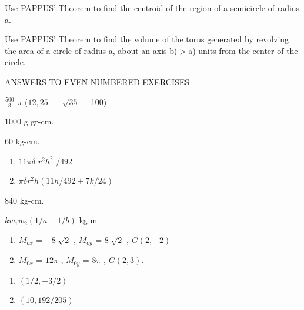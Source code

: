 \documentclass[11pt]{amsbook}
\begin{document}
   	 \begin{hEnumerateArabic}
 		 \setcounter{enumi}{58}
  		 \item Use PAPPUS' Theorem to  find the centroid of the region of a semicircle 
         	 of radius a.
         	 \item Use PAPPUS' Theorem to find the volume of the torus generated by 
        	 revolving the area of a circle of radius a, about an axis b($>$a) units 
         	 from the center of the circle. \\
	\end{hEnumerateArabic}
    
    	 ANSWERS TO EVEN NUMBERED EXERCISES
    	\begin{hEnumerateArabic}
    		\setcounter{enumi}{35}
    		\item \( \frac{500}{3} \) $\pi$ ($12,25$ + $\sqrt[]{35}$ + 100)
    		\setcounter{enumi}{37}
   			\item 1000 g gr-cm.  
    		\setcounter{enumi}{39}
   			\item 60 kg-cm.
    		\setcounter{enumi}{41}
                \item
    			\begin{enumerate}[label=\alph*)]
				\item $11$$\pi$$\delta$ $r^2$$h^2$ $/ 492$   
        			\item $\pi$$\delta$$r^2$$h(11h/492 + 7k/24)$
   			\end{enumerate}	
    		\setcounter{enumi}{43}
   		\item 840 kg-cm.
    		\setcounter{enumi}{45}
    		\item $kw_1w_2(1/a -1/b)$ kg-m
           	\setcounter{enumi}{47}
           	\item
			 \begin{enumerate}[label=\alph*)]
				\item $M_{ox}$ = $-8 \sqrt[]{2}$ , $M_{oy}$ = $8 \sqrt[]{2}$ , $G(2, -2)$
       			 	\item $M_{0x}$ = $12\pi$ , $M_{0y}$ = $8\pi$ , $G(2, 3)$.
   			 \end{enumerate}	
    		\setcounter{enumi}{49}
                \item
    			\begin{enumerate}[label=\alph*)]
				\item $(1/2, -3/2)$
        			\item $(10, 192/205)$
    			\end{enumerate}
    		\setcounter{enumi}{51}
                \item

\end{hEnumerateArabic}
\end{document}
